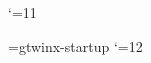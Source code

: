 
\catcode`\@=11

\def\SN#1{#1}
\def\SND#1{$\underline{\hbox{#1}}$}
\let\SNs=\SN \let\SNDs=\SND

\def\title{Index}            %
\def\sechead{}               %
\def\grouphead{}
\nosecs                      %
\def\twinxtop{\centerline{\titlefont\title}\vskip 24pt}
\def\twinxsep{}
\def\twinxnext{; }           %
\def\twinxref#1#2{\twinxsep{\sc#1}~#2\global\let\twinxsep\twinxnext}
\def\I#1#2{\global\let\twinxsep\empty\II{#1}{#2}}
\hfuzz=1pt

\openin\z@=gtwinx-startup
\ifeof\z@ \else \closein\z@  \fi
\catcode`\@=12

